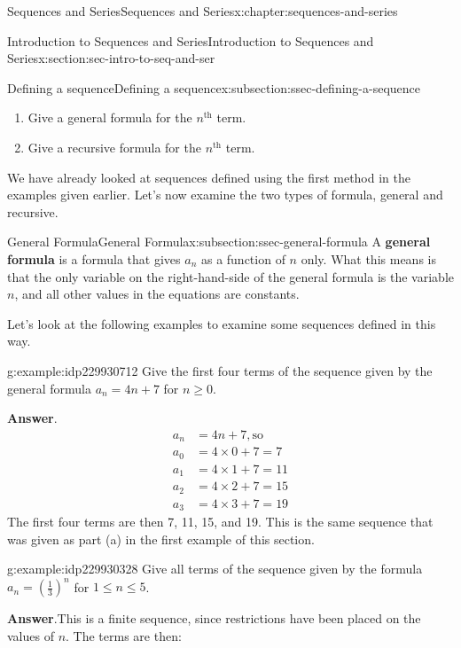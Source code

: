 \documentclass[twoside,10pt,]{book}
\newcommand{\blocktitlefont}{\relax}
\newcommand{\terminology}[1]{\textbf{#1}}
\numberwithin{equation}{section}
\newcommand{\nth}{{n^{\text{th}}}}
\newcommand{\amp}{&}
\begin{document}
\begin{chapterptx}{Sequences and Series}{}{Sequences and Series}{}{}{x:chapter:sequences-and-series}
\begin{sectionptx}{Introduction to Sequences and Series}{}{Introduction to Sequences and Series}{}{}{x:section:sec-intro-to-seq-and-ser}
\begin{subsectionptx}{Defining a sequence}{}{Defining a sequence}{}{}{x:subsection:ssec-defining-a-sequence}
\begin{enumerate}[label=(\alph*)]
\item{}Give a general formula for the \(\nth{}\) term.%
\item{}Give a recursive formula for the \(\nth{}\) term.%
\end{enumerate}
%
\par
We have already looked at sequences defined using the first method in the examples given earlier.  Let's now examine the two types of formula, general and recursive.%
\end{subsectionptx}
%
%
\typeout{************************************************}
\typeout{************************************************}
%
\begin{subsectionptx}{General Formula}{}{General Formula}{}{}{x:subsection:ssec-general-formula}
A \terminology{general formula} is a formula that gives \(a_n\) as a function of \(n\) only.  What this means is that the only variable on the right-hand-side of the general formula is the variable \(n\), and all other values in the equations are constants.%
\par
Let's look at the following examples to examine some sequences defined in this way. \begin{example}{}{g:example:idp229930712}%
Give the first four terms of the sequence given by the general formula \(a_n = 4n + 7\) for \(n \ge 0\).\par\smallskip%
\noindent\textbf{\blocktitlefont Answer}.\label{g:answer:idp229929688}{}\hypertarget{g:answer:idp229929688}{}\quad{}%
\begin{align*}
a_n \amp = 4n + 7, \text{so}\\
a_0 \amp = 4\times0 + 7 = 7\\
a_1 \amp = 4\times1 + 7 = 11\\
a_2 \amp = 4\times2 + 7 = 15\\
a_3 \amp = 4\times3 + 7 = 19
\end{align*}
The first four terms are then 7, 11, 15, and 19.  This is the same sequence that was given as part (a) in the first  example of this section.\end{example}
 \begin{example}{}{g:example:idp229930328}%
Give all terms of the sequence given by the formula \({a_n} = {\left( {\frac{1}{3}} \right)^n}\) for \(1 \le n \le 5\).\par\smallskip%
\noindent\textbf{\blocktitlefont Answer}.\label{g:answer:idp229926360}{}\hypertarget{g:answer:idp229926360}{}\quad{}This is a finite sequence, since restrictions have been placed on the values of \(n\).  The terms are then:%

\end{example}
\end{subsectionptx}
\end{sectionptx}
\end{chapterptx}
\end{document}
